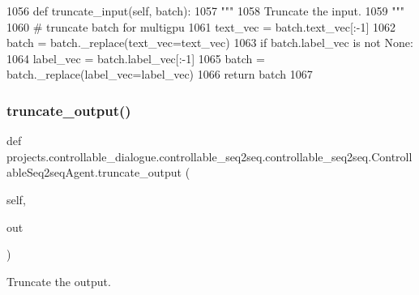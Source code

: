 \begin{DoxyCode}
1056     \textcolor{keyword}{def }truncate\_input(self, batch):
1057         \textcolor{stringliteral}{"""}
1058 \textcolor{stringliteral}{        Truncate the input.}
1059 \textcolor{stringliteral}{        """}
1060         \textcolor{comment}{# truncate batch for multigpu}
1061         text\_vec = batch.text\_vec[:-1]
1062         batch = batch.\_replace(text\_vec=text\_vec)
1063         \textcolor{keywordflow}{if} batch.label\_vec \textcolor{keywordflow}{is} \textcolor{keywordflow}{not} \textcolor{keywordtype}{None}:
1064             label\_vec = batch.label\_vec[:-1]
1065             batch = batch.\_replace(label\_vec=label\_vec)
1066         \textcolor{keywordflow}{return} batch
1067 
\end{DoxyCode}
\mbox{\label{classprojects_1_1controllable__dialogue_1_1controllable__seq2seq_1_1controllable__seq2seq_1_1ControllableSeq2seqAgent_a4b656f8d8634a71088b3cb9e719f3629}} 
\subsubsection{\texorpdfstring{truncate\+\_\+output()}{truncate\_output()}}
{\footnotesize\ttfamily def projects.\+controllable\+\_\+dialogue.\+controllable\+\_\+seq2seq.\+controllable\+\_\+seq2seq.\+Controllable\+Seq2seq\+Agent.\+truncate\+\_\+output (\begin{DoxyParamCaption}\item[{}]{self,  }\item[{}]{out }\end{DoxyParamCaption})}

\begin{DoxyVerb}Truncate the output.
\end{DoxyVerb}
 

